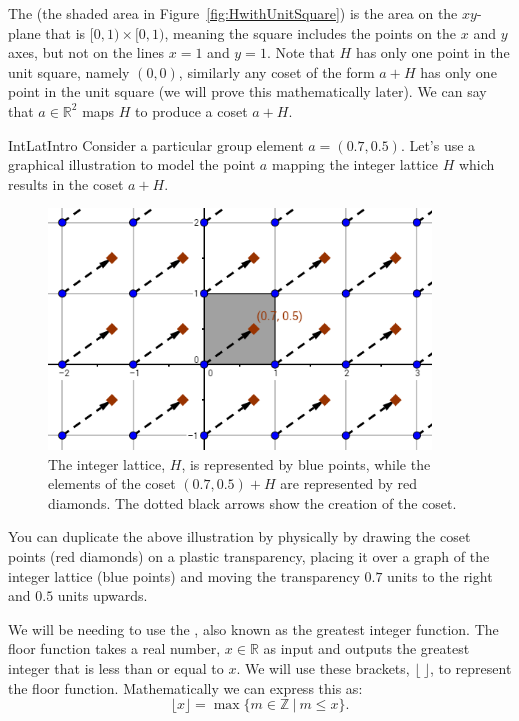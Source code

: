 The  (the shaded area in Figure~\ref{fig:HwithUnitSquare}) is the area on the $xy$-plane that is $[0,1) \times [0,1)$, meaning the square includes the points on the $x$ and $y$ axes, but not on the lines $x=1$ and $y=1$. Note that $H$ has only one point in the unit square, namely $(0,0)$, similarly any coset of the form $a+H$ has only one point in the unit square (we will prove this mathematically later). We can say that $a\in \mathbb{R}^2$ maps $H$ to produce a coset $a+H$.

\begin{example}{IntLatIntro} Consider a particular group element $a=(0.7,0.5)$. Let's use a graphical illustration to model the point $a$ mapping the integer lattice $H$ which results in the coset $a+H$.

\begin{figure}[htpb]
\begin{center}
\includegraphics[width=4in]{images/Lattice_xPlusH.png}
\caption{\label{fig:Lattice_xPlusH}The integer lattice, $H$, is represented by blue points, while the elements of the coset $(0.7,0.5)+H$ are represented by red diamonds. The dotted black arrows show the creation of the coset.}
\end{center}
\end{figure}

You can duplicate the above illustration by physically by drawing the coset points (red diamonds) on a plastic transparency, placing it over a graph of the integer lattice (blue points) and moving the transparency $0.7$ units to the right and $0.5$ units upwards.
\end{example}

We will be needing to use the , also known as the greatest integer function. The floor function takes a real number, $x \in \mathbb{R}$ as input and outputs the greatest integer that is less than or equal to $x$. We will use these brackets, $\lfloor~\rfloor$, to represent the floor function. Mathematically we can express this as:
$$\lfloor x \rfloor=\max \{ m\in \mathbb{Z} ~|~m\leq x \}.$$

